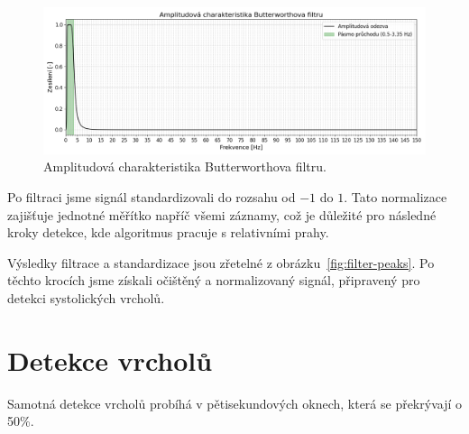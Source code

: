 \begin{figure}[h]
	\label{fig:my_AFC}
	\centering
	\includegraphics[width=1\textwidth]{./obrazky/My_AFC.png}
	\vspace{-5mm}
	\caption[Vlastní amplitudová charakteristika Butterworthova filtru]{Amplitudová charakteristika Butterworthova filtru.}
	\vspace{-5mm}
\end{figure}

Po filtraci jsme signál standardizovali do rozsahu od \(-1\) do \(1\).
Tato normalizace zajišťuje jednotné měřítko napříč všemi záznamy, což je důležité pro následné kroky detekce, kde algoritmus pracuje s relativními prahy.

Výsledky filtrace a standardizace jsou zřetelné z obrázku~\ref{fig:filter-peaks}.
Po těchto krocích jsme získali očištěný a normalizovaný signál, připravený pro detekci systolických vrcholů.

\section{Detekce vrcholů}
\label{sec:alg_peaks}
Samotná detekce vrcholů probíhá v pětisekundových oknech, která se překrývají o 50\%.

